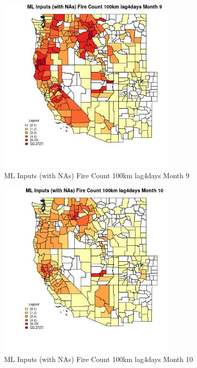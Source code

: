 \begin{figure} 
\centering  
\includegraphics[width=0.77\textwidth]{Code_Outputs/Report_ML_input_PM25_Step4_part_f_de_duplicated_aveswNAs_CountyFire_Count_100km_lag4daysmedianMonth9.jpg} 
\caption{\label{fig:Report_ML_input_PM25_Step4_part_f_de_duplicated_aveswNAsCountyFire_Count_100km_lag4daysmedianMonth9}ML Inputs (with NAs) Fire Count 100km lag4days Month 9} 
\end{figure} 
 

\begin{figure} 
\centering  
\includegraphics[width=0.77\textwidth]{Code_Outputs/Report_ML_input_PM25_Step4_part_f_de_duplicated_aveswNAs_CountyFire_Count_100km_lag4daysmedianMonth10.jpg} 
\caption{\label{fig:Report_ML_input_PM25_Step4_part_f_de_duplicated_aveswNAsCountyFire_Count_100km_lag4daysmedianMonth10}ML Inputs (with NAs) Fire Count 100km lag4days Month 10} 
\end{figure} 
 

